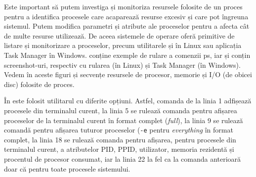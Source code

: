 Este important să putem investiga și monitoriza resursele folosite de un proces pentru a identifica procesele care acaparează resurse excesiv și care pot îngreuna sistemul.
Putem modifica parametri și atribute ale proceselor pentru a afecta cât de multe resurse utilizează.
De aceea sistemele de operare oferă primitive de listare și monitorizare a proceselor, precum utilitarele  și  în Linux sau aplicația Task Manager în Windows.
 conține exemple de rulare a comenzii ps, iar  și  conțin screenshot-uri, respectiv cu rularea  (în Linux) și Task Manager (în Windows).
Vedem în aceste figuri și secvențe resursele de procesor, memorie și I/O (de obicei disc) folosite de proces.


În  este folosit utilitarul  cu diferite opțiuni.
Astfel, comanda de la linia 1 adfișează procesele din terminalul curent, la linia 5 se rulează comanda pentru afișarea proceselor de la terminalul curent în format complet (\textit{full}), la linia 9 se rulează comandă pentru afișarea tuturor proceselor (\texttt{-e} pentru \textit{everything} în format complet, la linia 18 se rulează comanda pentru afișarea, pentru procesele din terminalul curent, a atributelor PID, PPID, utilizator, memoria rezidentă și procentul de procesor consumat, iar la linia 22 la fel ca la comanda anterioară doar că pentru toate procesele sistemului.

